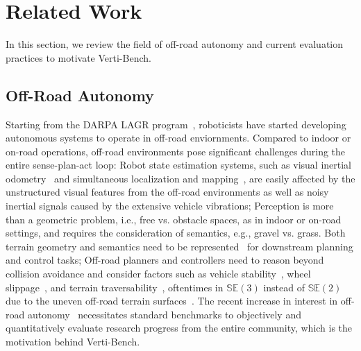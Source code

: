 \section{Related Work}
\label{sec::related}
In this section, we review the field of off-road autonomy and current evaluation practices to motivate Verti-Bench. 


\subsection{Off-Road Autonomy}
Starting from the DARPA LAGR program~\cite{jackel2006darpa}, roboticists have started developing autonomous systems to operate in off-road enviornments. Compared to indoor or on-road operations, off-road environments pose significant challenges during the entire sense-plan-act loop: Robot state estimation systems, such as visual inertial odometry~\cite{forster2016manifold} and simultaneous localization and mapping~\cite{stachniss2016simultaneous}, are easily affected by the unstructured visual features from the off-road environments as well as noisy inertial signals caused by the extensive vehicle vibrations; Perception is more than a geometric problem, i.e., free vs. obstacle spaces, as in indoor or on-road settings, and requires the consideration of semantics, e.g., gravel vs. grass. Both terrain geometry and semantics need to be represented~\cite{miki2022elevation, ewen2022these, dashora2022hybrid, sikand2022visual} for downstream planning and control tasks; Off-road planners and controllers need to reason beyond collision avoidance and consider factors such as vehicle stability~\cite{pokhrel2024cahsor, bae2021curriculum}, wheel slippage~\cite{siva2019robot, sharma2023ramp, siva2022nauts}, and terrain traversability~\cite{castro2023does, cai2024evora, seo2023learning, fan2021step}, oftentimes in $\mathbb{SE}(3)$ instead of $\mathbb{SE}(2)$~\cite{datar2024toward} due to the uneven off-road terrain surfaces~\cite{lee2023learning, datar2024toward}. 
The recent increase in interest in off-road autonomy~\cite{xiao2022motion} necessitates standard benchmarks to objectively and quantitatively evaluate research progress from the entire community, which is the motivation behind Verti-Bench. 

